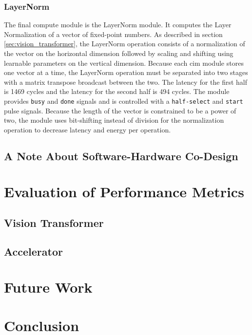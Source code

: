 \documentclass[12pt, hidelinks]{article}
\begin{document}
\subsubsection{LayerNorm}
The final compute module is the LayerNorm module. It computes the Layer Normalization of a vector of fixed-point numbers. As described in section \ref{sec:vision_transformer}, the LayerNorm operation consists of a normalization of
the vector on the horizontal dimension followed by scaling and shifting using learnable parameters on the vertical dimension. Because each \ac{cim} module stores one vector at a time, the LayerNorm operation must be separated into 
two stages with a matrix transpose broadcast between the two. The latency for the first half is 1469 cycles and the latency for the second half is 494 cycles. The module provides \texttt{busy} and \texttt{done} signals and is controlled
with a \texttt{half-select} and \texttt{start} pulse signals. Because the length of the vector is constrained to be a power of two, the module uses bit-shifting instead of division for the normalization operation to decrease latency and energy
per operation.

\subsection{A Note About Software-Hardware Co-Design}

\lipsum[1]

\newpage
\section{Evaluation of Performance Metrics}
\lipsum[1]
\subsection{Vision Transformer}
\lipsum[1]
\subsection{Accelerator}
\lipsum[1]

\newpage
\section{Future Work}
\lipsum[1]

\newpage
\section{Conclusion}
\lipsum[1]

\newpage

\printbibliography
\newpage





\newpage
\end{document}
